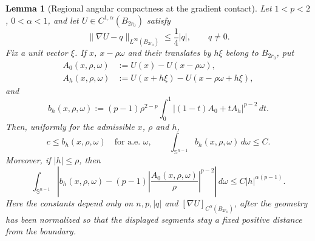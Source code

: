 \documentclass[11pt,reqno]{amsart}
\numberwithin{equation}{section}
\newcommand{\dd}{\,d}
\newtheorem{lemma}[theorem]{Lemma}
\theoremstyle{remark}
\begin{document}
\begin{lemma}[Regional angular compactness at the gradient contact]
\label{lem:regional-angular-compactness}
Let $1<p<2$, $0<\alpha<1$, and let $U\in C^{1,\alpha}(B_{2r_0})$ satisfy
\begin{equation}
 \|\nabla U-q\|_{L^\infty(B_{2r_0})}\le\frac14|q|,
 \qquad q\ne0.
 \label{eq:noncritical-gradient-tube}
\end{equation}
Fix a unit vector $\xi$.  If $x$, $x-\rho\omega$ and their translates by
$h\xi$ belong to $B_{2r_0}$, put
\begin{align*}
 A_0(x,\rho,\omega)&:=U(x)-U(x-\rho\omega),\\
 A_h(x,\rho,\omega)&:=U(x+h\xi)-U(x-\rho\omega+h\xi),
\end{align*}
and
\begin{equation*}
 b_h(x,\rho,\omega)
 :=(p-1)\rho^{2-p}\int_0^1
 |(1-t)A_0+tA_h|^{p-2}\dd t.
\end{equation*}
Then, uniformly for the admissible $x$, $\rho$ and $h$,
\begin{equation}
 c\le b_h(x,\rho,\omega)\quad\text{for a.e. }\omega,
 \qquad
 \int_{\mathbb S^{n-1}}b_h(x,\rho,\omega)\dd\omega\le C.
 \label{eq:regional-angular-ellipticity}
\end{equation}
Moreover, if $|h|\le\rho$, then
\begin{equation}
 \int_{\mathbb S^{n-1}}
 \left|b_h(x,\rho,\omega)
 -(p-1)\left|\frac{A_0(x,\rho,\omega)}{\rho}\right|^{p-2}
 \right|\dd\omega
 \le C|h|^{\alpha(p-1)}.
 \label{eq:regional-angular-convergence}
\end{equation}
Here the constants depend only on $n,p,|q|$ and
$[\nabla U]_{C^\alpha(B_{2r_0})}$, after the geometry has been normalized
so that the displayed segments stay a fixed positive distance from the
boundary.
\end{lemma}
\end{document}
